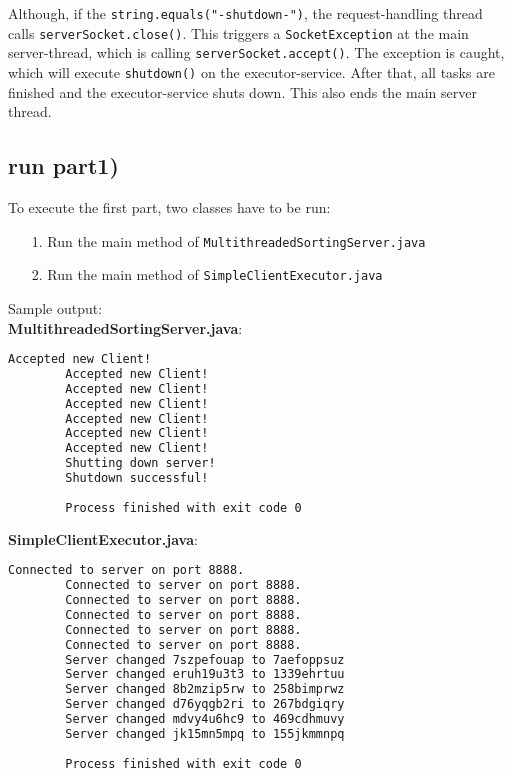 \documentclass{article}
\begin{document}
    Although, if the \texttt{string.equals("-shutdown-")}, the request-handling thread calls \texttt{serverSocket.close()}. This triggers a \texttt{SocketException} at the main server-thread, which is calling \texttt{serverSocket.accept()}. The exception is caught, which will execute \texttt{shutdown()} on the executor-service. After that, all tasks are finished and the executor-service shuts down. This also ends the main server thread.\\
    
    \subsection*{run part1)}
    
      To execute the first part, two classes have to be run:
      \begin{itemize}
    	\item[1.] Run the main method of \texttt{MultithreadedSortingServer.java}
    	\item[2.] Run the main method of \texttt{SimpleClientExecutor.java}
      \end{itemize}
      Sample output:\\
      \textbf{MultithreadedSortingServer.java}:\\
      \begin{lstlisting}[language=sh]
        Accepted new Client!
        Accepted new Client!
        Accepted new Client!
        Accepted new Client!
        Accepted new Client!
        Accepted new Client!
        Accepted new Client!
        Shutting down server!
        Shutdown successful!
      
        Process finished with exit code 0
      \end{lstlisting}
      \textbf{SimpleClientExecutor.java}:\\
      \begin{lstlisting}[language=sh]
        Connected to server on port 8888.
        Connected to server on port 8888.
        Connected to server on port 8888.
        Connected to server on port 8888.
        Connected to server on port 8888.
        Connected to server on port 8888.
        Server changed 7szpefouap to 7aefoppsuz
        Server changed eruh19u3t3 to 1339ehrtuu
        Server changed 8b2mzip5rw to 258bimprwz
        Server changed d76yqgb2ri to 267bdgiqry
        Server changed mdvy4u6hc9 to 469cdhmuvy
        Server changed jk15mn5mpq to 155jkmmnpq
      
        Process finished with exit code 0
      \end{lstlisting}     
      
\end{document}
